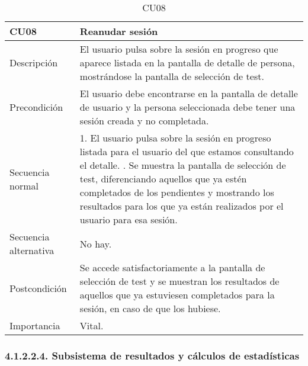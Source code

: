 \begin{table}[H]
\label{CU08}
\begin{center}
\begin{tabular}{| l | p{10cm} |}
\hline
CU08 & Reanudar sesión\\
\hline
Descripción & El usuario pulsa sobre la sesión en progreso que aparece listada en la pantalla de detalle de persona, mostrándose la pantalla de selección de test.\\
\hline
Precondición & El usuario debe encontrarse en la pantalla de detalle de usuario y la persona seleccionada debe tener una sesión creada y no completada.\\
\hline
Secuencia normal & 1. El usuario pulsa sobre la sesión en progreso listada para el usuario del que estamos consultando el detalle.
\newline 2. Se muestra la pantalla de selección de test, diferenciando aquellos que ya estén completados de los pendientes y mostrando los resultados para los que ya están realizados por el usuario para esa sesión.\\
\hline
Secuencia alternativa & No hay.\\
\hline
Postcondición & Se accede satisfactoriamente a la pantalla de selección de test y se muestran los resultados de aquellos que ya estuviesen completados para la sesión, en caso de que los hubiese.\\
\hline
Importancia & Vital.\\
\hline
\end{tabular}
\end{center}
\caption{CU08}
\end{table}

\subsubsection{4.1.2.2.4. Subsistema de resultados y cálculos de estadísticas}

